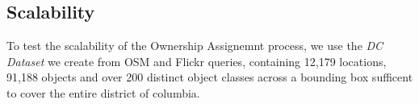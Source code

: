 \subsection{Scalability}


To test the scalability of the Ownership Assignemnt process, we use the \emph{DC Dataset} we create from OSM and Flickr queries, containing 12,179 locations, 91,188 objects and over 200 distinct object classes across a bounding box sufficent to cover the entire district of columbia.









 
